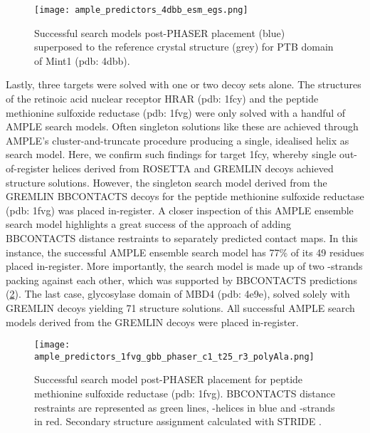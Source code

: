 \begin{figure}[H]
    \centering
    \texttt{[image: ample\_predictors\_4dbb\_esm\_egs.png]}
    \caption{Successful search models post-PHASER placement (blue) superposed to the reference crystal structure (grey) for PTB domain of Mint1 (\gls{pdb}: 4dbb).}
    \label{fig:ample_predictors_4dbb_esm_egs}
\end{figure}

Lastly, three targets were solved with one or two decoy sets alone. The structures of the retinoic acid nuclear receptor HRAR (\gls{pdb}: 1fcy) and the peptide methionine sulfoxide reductase (\gls{pdb}: 1fvg) were only solved with a handful of AMPLE search models. Often singleton solutions like these are achieved through AMPLE’s cluster-and-truncate procedure producing a single, idealised helix as search model. Here, we confirm such findings for target 1fcy, whereby single out-of-register helices derived from ROSETTA and GREMLIN decoys achieved structure solutions. However, the singleton search model derived from the GREMLIN BBCONTACTS decoys for the peptide methionine sulfoxide reductase (\gls{pdb}: 1fvg) was placed in-register. A closer inspection of this AMPLE ensemble search model highlights a great success of the approach of adding BBCONTACTS distance restraints to separately predicted contact maps. In this instance, the successful AMPLE ensemble search model has 77\% of its 49 residues placed in-register. More importantly, the search model is made up of two \textbeta-strands packing against each other, which was supported by BBCONTACTS predictions (\cref{fig:ample_predictors_1fvg_gbb_phaser_c1_t25_r3_polyAla}). The last case, glycosylase domain of MBD4 (\gls{pdb}: 4e9e), solved solely with GREMLIN decoys yielding 71 structure solutions. All successful AMPLE search models derived from the GREMLIN decoys were placed in-register.

\begin{figure}[H]
    \centering
    \texttt{[image: ample\_predictors\_1fvg\_gbb\_phaser\_c1\_t25\_r3\_polyAla.png]}
    \caption{Successful search model post-PHASER placement for peptide methionine sulfoxide reductase (\gls{pdb}: 1fvg). BBCONTACTS distance restraints are represented as green lines, \textalpha-helices in blue and \textbeta-strands in red. Secondary structure assignment calculated with STRIDE \cite{Frishman1995-si}.}
    \label{fig:ample_predictors_1fvg_gbb_phaser_c1_t25_r3_polyAla}
\end{figure}

